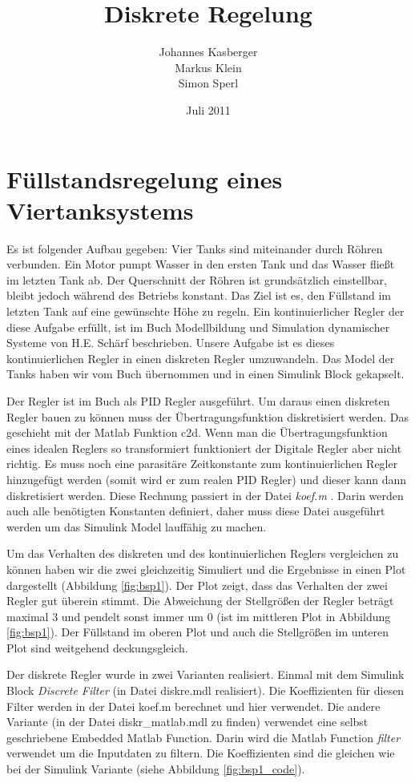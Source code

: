 \documentclass[a4paper]{article}
\title{Diskrete Regelung}
\author{Johannes Kasberger\\Markus Klein\\Simon Sperl}
\date{Juli 2011}
\begin{document}
\maketitle

\section{Füllstandsregelung eines Viertanksystems}

Es ist folgender Aufbau gegeben: Vier Tanks sind miteinander durch Röhren verbunden. Ein Motor pumpt Wasser in den ersten Tank und das Wasser fließt im letzten Tank ab. Der Querschnitt der Röhren ist grundsätzlich einstellbar, bleibt jedoch während des Betriebs konstant. Das Ziel ist es, den Füllstand im letzten Tank auf eine gewünschte Höhe zu regeln. Ein kontinuierlicher Regler der diese Aufgabe erfüllt, ist im Buch Modellbildung und Simulation dynamischer Systeme von H.E. Schärf beschrieben. Unsere Aufgabe ist es dieses kontinuierlichen Regler in einen diskreten Regler umzuwandeln. Das Model der Tanks haben wir vom Buch übernommen und in einen Simulink Block gekapselt. 

Der Regler ist im Buch als PID Regler ausgeführt. Um daraus einen diskreten Regler bauen zu können muss der Übertragungsfunktion diskretisiert werden. Das geschieht mit der Matlab Funktion c2d. Wenn man die Übertragungsfunktion eines idealen Reglers so transformiert funktioniert der Digitale Regler aber nicht richtig. Es muss noch eine parasitäre Zeitkonstante zum kontinuierlichen Regler hinzugefügt werden (somit wird er zum realen PID Regler) und dieser kann dann diskretisiert werden. Diese Rechnung passiert in der Datei \emph{koef.m }. Darin werden auch alle benötigten Konstanten definiert, daher muss diese Datei ausgeführt werden um das Simulink Model lauffähig zu machen. 

Um das Verhalten des diskreten und des kontinuierlichen Reglers vergleichen zu können haben wir die zwei gleichzeitig Simuliert und die Ergebnisse in einen Plot dargestellt (Abbildung \ref{fig:bsp1}). Der Plot zeigt, dass das Verhalten der zwei Regler gut überein stimmt. Die Abweichung der Stellgrößen der Regler beträgt maximal 3 und pendelt sonst immer um 0 (ist im mittleren Plot in Abbildung \ref{fig:bsp1}). Der Füllstand im oberen Plot und auch die Stellgrößen im unteren Plot sind weitgehend deckungsgleich.

Der diskrete Regler wurde in zwei Varianten realisiert. Einmal mit dem Simulink Block \emph{Discrete Filter} (in Datei diskre.mdl realisiert). Die Koeffizienten für diesen Filter werden in der Datei koef.m berechnet und hier verwendet. Die andere Variante (in der Datei diskr\_matlab.mdl zu finden) verwendet eine selbst geschriebene Embedded Matlab Function. Darin wird die Matlab Function \emph{filter} verwendet um die Inputdaten zu filtern. Die Koeffizienten sind die gleichen wie bei der Simulink Variante (siehe Abbildung \ref{fig:bsp1_code}).
\end{document}
